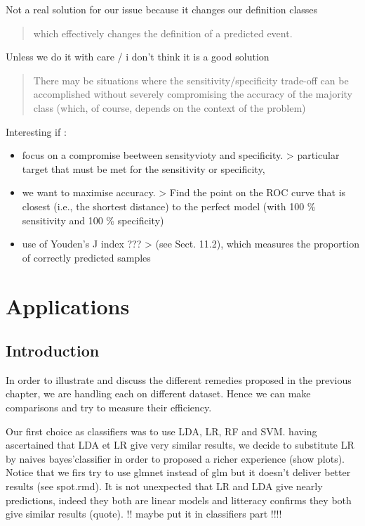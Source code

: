 \documentclass[
]{report}
\providecommand{\tightlist}{%
  \setlength{\itemsep}{0pt}\setlength{\parskip}{0pt}}
\begin{document}
Not a real solution for our issue because it changes our definition classes

\begin{quote}
which eﬀectively changes the deﬁnition of a predicted event.
\end{quote}

Unless we do it with care / i don't think it is a good solution

\begin{quote}
There may be situations where the sensitivity/speciﬁcity trade-oﬀ can be accomplished without severely compromising the accuracy of the majority class (which, of course, depends on the context of the problem)
\end{quote}

Interesting if :

\begin{itemize}
\tightlist
\item
  focus on a compromise beetween sensityvioty and specificity.
  \textgreater{} particular target that must be met for the sensitivity or speciﬁcity,
\item
  we want to maximise accuracy.
  \textgreater{} Find the point on the ROC curve that is closest (i.e., the shortest distance) to the perfect model (with 100 \% sensitivity and 100 \% speciﬁcity)
\item
  use of Youden's J index ???
  \textgreater{} (see Sect. 11.2), which measures the proportion of correctly predicted samples
\end{itemize}

\hypertarget{applications}{%
\chapter{Applications}\label{applications}}

\hypertarget{introduction-1}{%
\section{Introduction}\label{introduction-1}}

In order \citep{xie2015} to illustrate and discuss the different remedies proposed in the previous chapter, we are handling each on different dataset. Hence we can make comparisons and try to measure their efficiency.

Our first choice as classifiers was to use LDA, LR, RF and SVM. having ascertained that LDA et LR give very similar results, we decide to substitute LR by naives bayes'classifier in order to proposed a richer experience (show plots). Notice that we firs try to use glmnet instead of glm but it doesn't deliver better results (see spot.rmd). It is not unexpected that LR and LDA give nearly predictions, indeed they both are linear models and litteracy confirms they both give similar results (quote). !! maybe put it in classifiers part !!!!
\end{document}
